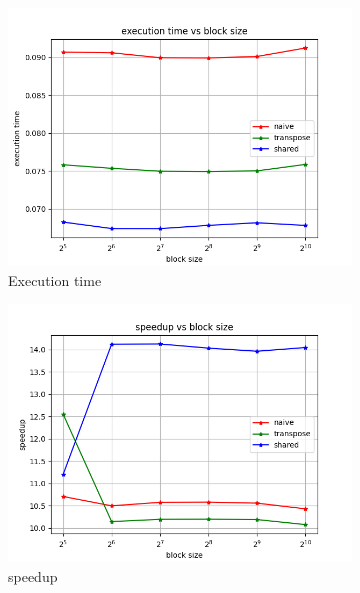 \documentclass{article}
\newcommand{\eng}[1]{#1}
\begin{document}
\begin{figure}[h]\centering
    \begin{subfigure}{0.45\textwidth}
        \includegraphics[width=\textwidth]{../a4/plots/execution_time.png}
        \caption{Execution time} 
        \label{fig:speedup_kmeans_n-t-s}
    \end{subfigure}
    \begin{subfigure}{0.45\textwidth}
        \includegraphics[width=\textwidth]{../a4/plots/speedup.png}
        \caption{\eng{speedup}}
    \end{subfigure}
    \vspace{1em}
    \begin{subfigure}{0.6\textwidth}

\end{subfigure}
\end{figure}
\end{document}
